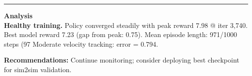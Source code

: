 \documentclass[a4paper,10pt]{article}
\begin{document}
\vspace{2pt}
\hrule
\vspace{2pt}

\footnotesize
\textbf{Analysis} \\[1pt]
\textbf{Healthy training.} Policy converged steadily with peak reward 7.98 @ iter 3,740.
Best model reward 7.23 (gap from peak: 0.75).
Mean episode length: 971/1000 steps (97%
Moderate velocity tracking: error = 0.794.

\textbf{Recommendations:}
Continue monitoring; consider deploying best checkpoint for sim2sim validation.
\end{document}
